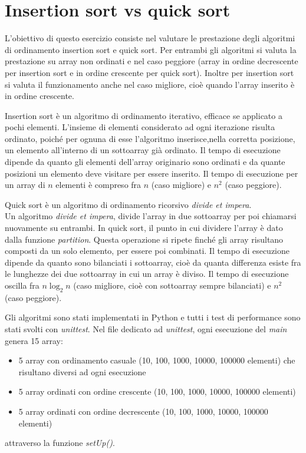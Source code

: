 \documentclass[a4paper, 11pt]{article}
\begin{document}
\section*{Insertion sort vs quick sort}
\vspace{0,4 cm}
L'obiettivo di questo esercizio consiste nel valutare le prestazione degli algoritmi di ordinamento insertion sort e quick sort. Per entrambi gli algoritmi si valuta la prestazione su array non ordinati e nel caso peggiore (array in ordine decrescente per insertion sort e in ordine crescente per quick sort). Inoltre per insertion sort si valuta il funzionamento anche nel caso migliore, cioè quando l'array inserito è in ordine crescente.

\vspace{0,5 cm}
Insertion sort è un algoritmo di ordinamento iterativo, efficace se applicato a pochi elementi. L'insieme di elementi considerato ad ogni iterazione risulta ordinato, poiché per ognuna di esse l'algoritmo inserisce,nella corretta posizione, un elemento all'interno di un sottoarray già ordinato. Il tempo di esecuzione dipende da quanto gli elementi dell'array originario sono ordinati e da quante posizioni un elemento deve visitare  per essere inserito. Il tempo di esecuzione per un array di $n$ elementi è compreso fra $n$ (caso migliore) e $n^{2}$ (caso peggiore).

\vspace{0,5 cm}
Quick sort è un algoritmo di ordinamento ricorsivo \textit{divide et impera}.\\
Un algoritmo \textit{divide et impera}, divide l'array in due sottoarray per poi chiamarsi nuovamente su entrambi. In quick sort, il punto in cui dividere l'array è dato dalla funzione \emph{partition}. Questa operazione si ripete finché gli array risultano composti da un solo elemento, per essere poi combinati. Il tempo di esecuzione dipende da quanto sono bilanciati i sottoarray, cioè da quanta differenza esiste fra le lunghezze dei due sottoarray in cui un array è diviso. Il tempo di esecuzione oscilla fra $n\log_2{n}$ (caso migliore, cioè con sottoarray sempre bilanciati) e $n^2$ (caso peggiore).

\vspace{0,5 cm}
Gli algoritmi sono stati implementati in Python e tutti i test di performance sono stati svolti con \emph{unittest}. Nel file dedicato ad \emph{unittest},  ogni esecuzione del \emph{main} genera 15 array:
\begin{itemize}
\item 5 array con ordinamento casuale (10, 100, 1000, 10000, 100000 elementi) che risultano diversi ad ogni esecuzione
\item 5 array ordinati con ordine crescente (10, 100, 1000, 10000, 100000 elementi)
\item 5 array ordinati con ordine decrescente (10, 100, 1000, 10000, 100000 elementi)
\end{itemize}
attraverso la funzione \emph{setUp()}.
	
\end{document}
